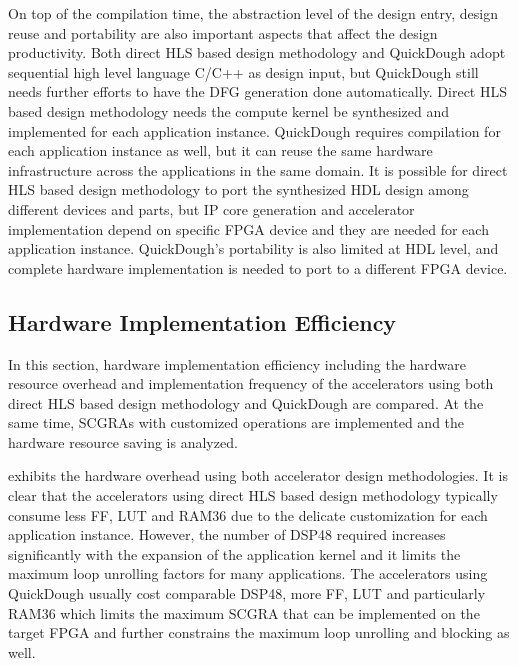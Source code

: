 On top of the compilation time, the abstraction level of the design entry, design reuse and portability are also important aspects that affect the design productivity. Both direct HLS based design methodology and QuickDough adopt sequential high level language C/C++ as design input, but QuickDough still needs further efforts to have the DFG generation done automatically. Direct HLS based design methodology needs the compute kernel be synthesized and implemented for each application instance. QuickDough requires compilation for each application instance as well, but it can reuse the same hardware infrastructure across the applications in the same domain. It is possible for direct HLS based design methodology to port the synthesized HDL design among different devices and parts, but IP core generation and accelerator implementation depend on specific FPGA device and they are needed for each application instance. QuickDough's portability is also limited at HDL level, and complete hardware implementation is needed to port to a different FPGA device.

\subsection{Hardware Implementation Efficiency}
In this section, hardware implementation efficiency including the hardware resource overhead and implementation frequency of the accelerators using both direct HLS based design methodology and QuickDough are compared. At the same time, SCGRAs with customized operations are implemented and the hardware resource saving is analyzed.

 exhibits the hardware overhead using both accelerator design methodologies. It is clear that the accelerators using direct HLS based design methodology typically consume less FF, LUT and RAM36 due to the delicate customization for each application instance. However, the number of DSP48 required increases significantly with the expansion of the application kernel and it limits the maximum loop unrolling factors for many applications. The accelerators using QuickDough usually cost comparable DSP48, more FF, LUT and particularly RAM36 which limits the maximum SCGRA that can be implemented on the target FPGA and further constrains the maximum loop unrolling and blocking as well.

